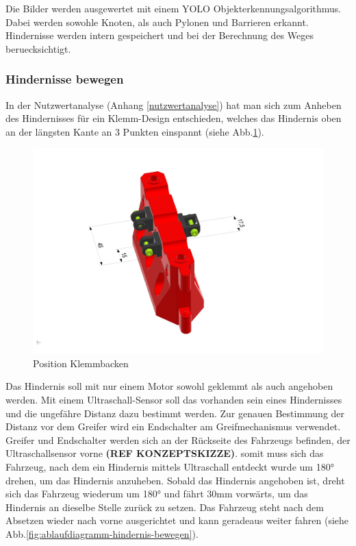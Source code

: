 Die Bilder werden ausgewertet mit einem YOLO Objekterkennungsalgorithmus. Dabei werden sowohle Knoten, als auch Pylonen und Barrieren erkannt. Hindernisse werden intern gespeichert und bei der Berechnung des Weges beruecksichtigt.


\newpage

\subsubsection{Hindernisse bewegen}

In der Nutzwertanalyse (Anhang \ref{nutzwertanalyse}) hat man sich zum Anheben des Hindernisses für ein Klemm-Design entschieden, welches das Hindernis oben an der längsten Kante an 3 Punkten einspannt (siehe Abb.\ref{fig:obstacle_clamping_concept}). 

\begin{figure}[H]
\centering
\includegraphics[width=0.95\linewidth]{assets/greifer-prototyp/Greifer_Backen_Trimetric.png} 
\caption{Position Klemmbacken}
\label{fig:obstacle_clamping_concept}
\end{figure}

Das Hindernis soll mit nur einem Motor sowohl geklemmt als auch angehoben werden. Mit einem Ultraschall-Sensor soll das vorhanden sein eines Hindernisses und die ungefähre Distanz dazu bestimmt werden. Zur genauen Bestimmung der Distanz vor dem Greifer wird ein Endschalter am Greifmechanismus verwendet.
Greifer und Endschalter werden sich an der Rückseite des Fahrzeugs befinden, der Ultraschallsensor vorne \textbf{(REF KONZEPTSKIZZE)}. somit muss sich das Fahrzeug, nach dem ein Hindernis mittels Ultraschall entdeckt wurde um 180° drehen, um das Hindernis anzuheben. Sobald das Hindernis angehoben ist, dreht sich das Fahrzeug wiederum um 180° und fährt 30mm vorwärts, um das Hindernis an dieselbe Stelle zurück zu setzen. Das Fahrzeug steht nach dem Absetzen wieder nach vorne ausgerichtet und kann geradeaus weiter fahren (siehe  Abb.\ref{fig:ablaufdiagramm-hindernis-bewegen}). 

